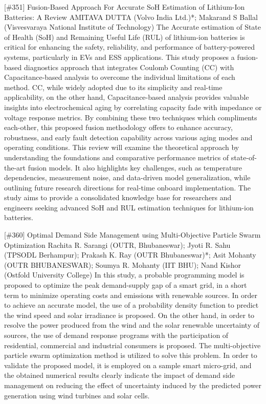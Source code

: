 {} \begin{abstract_online} {[\#351] Fusion-Based Approach For Accurate SoH Estimation of Lithium-Ion Batteries: A Review} {} {AMITAVA DUTTA (Volvo India Ltd.)*; Makarand S Ballal (Visvesvaraya National Institute of Technology)} {} The Accurate estimation of State of Health (SoH) and Remaining Useful Life (RUL) of lithium-ion batteries is critical for enhancing the safety, reliability, and performance of battery-powered systems, particularly in EVs and ESS applications. This study proposes a fusion-based diagnostics approach that integrates Coulomb Counting (CC) with Capacitance-based analysis to overcome the individual limitations of each method. CC, while widely adopted due to its simplicity and real-time applicability, on the other hand, Capacitance-based analysis provides valuable insights into electrochemical aging by correlating capacity fade with impedance or voltage response metrics. By combining these two techniques which compliments each-other, this proposed fusion methodology offers to enhance accuracy, robustness, and early fault detection capability across various aging modes and operating conditions. This review will examine the theoretical approach by understanding the foundations and comparative performance metrics of state-of-the-art fusion models. It also highlights key challenges, such as temperature dependencies, measurement noise, and data-driven model generalization, while outlining future research directions for real-time onboard implementation. The study aims to provide a consolidated knowledge base for researchers and engineers seeking advanced SoH and RUL estimation techniques for lithium-ion batteries. \end{abstract_online} 
{} \begin{abstract_online} {[\#360] Optimal Demand Side Management using Multi-Objective Particle Swarm Optimization} {} {Rachita R. Sarangi (OUTR, Bhubaneswar); Jyoti R. Sahu (TPSODL Berhampur); Prakash K. Ray (OUTR Bhubaneswar)*; Asit Mohanty (OUTR BHUBANESWAR); Soumya R. Mohanty (IIT BHU); Nand Kishor (Ostfold University College)} {} In this study, a probable programming model is proposed to optimize the peak demand-supply gap of a smart grid, in a short term to minimize operating costs and emissions with renewable sources. In order to achieve an accurate model, the use of a probability density function to predict the wind speed and solar irradiance is proposed. On the other hand, in order to resolve the power produced from the wind and the solar renewable uncertainty of sources, the use of demand response programs with the participation of residential, commercial and industrial consumers is proposed. The multi-objective particle swarm optimization method is utilized to solve this problem. In order to validate the proposed model, it is employed on a sample smart micro-grid, and the obtained numerical results clearly indicate the impact of demand side management on reducing the effect of uncertainty induced by the predicted power generation using wind turbines and solar cells. \end{abstract_online} 
